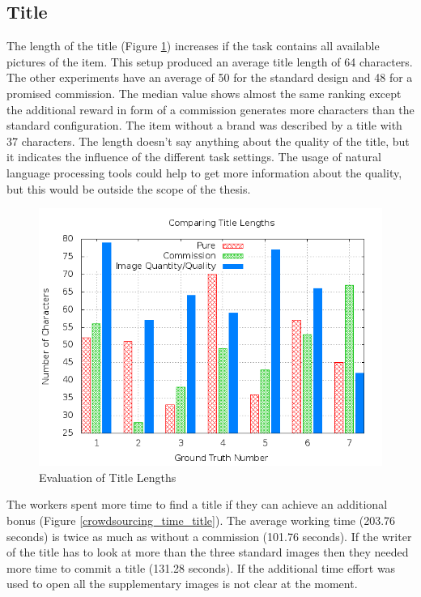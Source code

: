 \subsection{Title}
The length of the title (Figure \ref{crowdsourcing_title_length}) increases if the task contains all available pictures of the item. This setup produced an average title length of 64 characters. The other experiments have an average of 50 for the standard design and 48 for a promised commission. The median value shows almost the same ranking except the additional reward in form of a commission generates more characters than the standard configuration. The item without a brand was described by a title with 37 characters. The length doesn't say anything about the quality of the title, but it indicates the influence of the different task settings. The usage of natural language processing tools could help to get more information about the quality, but this would be outside the scope of the thesis.
\begin{figure}
\centering
\includegraphics[scale=0.55]{images/plots/crowdsourcing/plot_title_length.png}
\caption{Evaluation of Title Lengths}
\label{crowdsourcing_title_length}
\end{figure}
The workers spent more time to find a title if they can achieve an additional bonus (Figure \ref{crowdsourcing_time_title}). The average working time (203.76 seconds) is twice as much as without a commission (101.76 seconds). If the writer of the title has to look at more than the three standard images then they needed more time to commit a title (131.28 seconds). If the additional time effort was used to open all the supplementary images is not clear at the moment.
